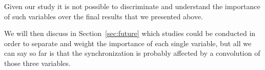 Given our study it is not possible to discriminate and understand the importance of such variables over the final results that we presented above.

We will then discuss in Section~\ref{sec:future} which studies could be conducted in order to separate and weight the importance of each single variable, but all we can say so far is that the synchronization is probably affected by a convolution of those three variables.